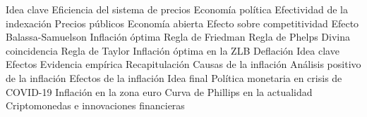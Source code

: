 \documentclass{nuevotema}
\begin{document}
\begin{esquema}[enumerate]
			\3 Idea clave
			\3 Eficiencia del sistema de precios
			\3 Economía política
			\3 Efectividad de la indexación
			\3 Precios públicos
		\2 Economía abierta
			\3 Efecto sobre competitividad
			\3 Efecto Balassa-Samuelson
		\2 Inflación óptima
			\3 Regla de Friedman
			\3 Regla de Phelps
			\3 Divina coincidencia
			\3 Regla de Taylor
			\3 Inflación óptima en la ZLB
		\2 Deflación
			\3 Idea clave
			\3 Efectos
			\3 Evidencia empírica
	\1[] 
		\2 Recapitulación
			\3 Causas de la inflación
			\3 Análisis positivo de la inflación
			\3 Efectos de la inflación
		\2 Idea final
			\3 Política monetaria en crisis de COVID-19
			\3 Inflación en la zona euro
			\3 Curva de Phillips en la actualidad
			\3 Criptomonedas e innovaciones financieras

\end{esquema}

\esquemalargo
\end{document}
